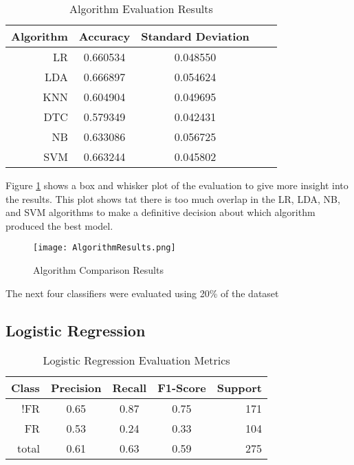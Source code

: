 \documentclass{article}
\begin{document}
\begin{table}[!htb]
\setlength\tabcolsep{0pt} %
\footnotesize\centering
\smallskip 
\begin{tabular*}{\columnwidth}{@{\extracolsep{\fill}}rcccr}
\toprule
  Algorithm&Accuracy&Standard Deviation \\
\midrule
  LR  & 0.660534    &0.048550\\
  LDA & 0.666897 & 0.054624\\
  KNN & 0.604904 & 0.049695\\
  DTC & 0.579349 & 0.042431\\
  NB & 0.633086  & 0.056725\\
  SVM & 0.663244  & 0.045802\\
  \midrule
\bottomrule
\end{tabular*}
\caption{Algorithm Evaluation Results} \label{tab:algs}
\end{table}

Figure \ref{fig:algs} shows a box and whisker plot of the evaluation to give more insight into the results. This plot shows tat there is too much overlap in the LR, LDA, NB, and SVM algorithms to make a definitive decision about which algorithm produced the best model. 

\begin{figure}[h]
\texttt{[image: AlgorithmResults.png]}
\caption{Algorithm Comparison Results}\label{fig:algs}
\centering
\end{figure}

The next four classifiers were evaluated using 20\% of the dataset
\subsection{Logistic Regression}

\begin{table}[!htb]
\setlength\tabcolsep{0pt} %
\footnotesize\centering
\smallskip 
\begin{tabular*}{\columnwidth}{@{\extracolsep{\fill}}rcccr}
\toprule
  Class&Precision&Recall&F1-Score&Support \\
\midrule
  !FR  & 0.65&0.87&0.75&171\\
  FR & 0.53&0.24&0.33&104 \\
  \midrule
total&0.61&0.63&0.59&275\\
\bottomrule
\end{tabular*}
\caption{Logistic Regression Evaluation Metrics} \label{tab:lda}
\end{table}
\end{document}
